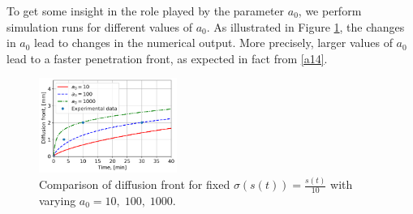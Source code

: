 \documentclass{article}
\begin{document}
To get some insight in the role played by the parameter $a_0$,  we perform simulation runs for different values of $a_0$.  As illustrated in Figure \ref{Fig:6}, the changes in $a_0$ lead to  changes  in the numerical output. More precisely, larger values of $a_0$ lead to a faster penetration front, as expected in fact from \eqref{a14}.

\begin{figure}[h!]
	\centering
	\includegraphics[width=0.40\textwidth]{Rubber_CombinedMV_Sigma_01.png}
\caption{Comparison of diffusion front for fixed $ \sigma(s(t)) = \frac{s(t)}{10}$ with varying $a_0 = 10,\; 100,\; 1000$.}
\label{Fig:6}	
\end{figure}

\end{document}
